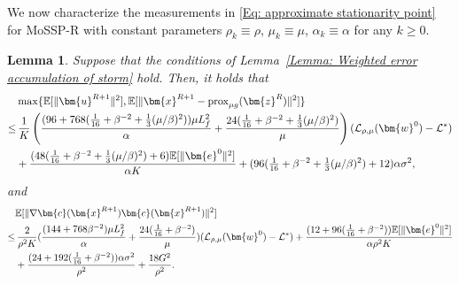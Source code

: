 \documentclass{article}
\theoremstyle{plain}
\newtheorem{lemma}{Lemma}[section]
\theoremstyle{definition}
\theoremstyle{remark}
\newcommand{\EE}{\mathbb{E}}
\newcommand{\prox}{\mathrm{prox}}
\newcommand{\bx}{\bm{x}}
\newcommand{\bc}{\bm{c}}
\newcommand{\be}{\bm{e}}
\newcommand{\bu}{\bm{u}}
\newcommand{\bz}{\bm{z}}
\newcommand{\calL}{\mathcal{L}}
\newcommand{\bw}{\bm{w}}
\numberwithin{equation}{section}
\begin{document}
We now characterize the measurements in \eqref{Eq: approximate stationarity point} for MoSSP-R with constant parameters $\rho_{k}\equiv \rho $, $\mu_{k}\equiv \mu$, $\alpha_{k}\equiv \alpha$ for any \(k \geq 0\).
\begin{lemma}
    \label{Lemma: the error bound of the infeasible stationarity in expectation for VR}
    Suppose that the conditions of Lemma~\ref{Lemma: Weighted
    error accumulation of storm} hold. Then, it holds that
   \begin{align}
\label{Eq: the criticality measure error bound in expectation for VR} & \max\{ \EE[\| \bu^{R+1}\|^{2}] , \EE [\| \bx^{R+1}- \prox_{\mu g}(\bz^{R})\|^{2}]\} \notag  \\
\leq & \, \frac{1}{K}\left( \frac{(96+768(\tfrac{1}{16}+\beta^{-2}+\tfrac{1}{3}(\mu/\beta)^2)) \mu L_f^{2}}{\alpha}+ \frac{24(\tfrac{1}{16} + \beta^{-2}+\tfrac{1}{3}(\mu/\beta)^2)}{\mu}\right) ( \calL_{\rho, \mu}(\bw^{0}) - \calL^{*}) \notag\\
& + \frac{( 48( \tfrac{1}{16} + \beta^{-2}+\tfrac{1}{3}(\mu/\beta)^2) + 6 )\EE [\| \be^{0}\|^{2}]}{\alpha K }+ ( 96 ( \tfrac{1}{16} + \beta^{-2}+\tfrac{1}{3}(\mu/\beta)^2) + 12)\alpha\sigma^{2},
    \end{align}
and
\begin{align}
\label{Eq: the infeasible stationarity error bound in expectation for VR}
&\EE [\|\nabla \bc(\bx^{R+1}) \bc(\bx^{R+1}) \|^{2}] \notag \\
\leq & \, \frac{2}{\rho^{2}K}( \frac{(144 +768 \beta^{-2}) \mu L^2_{f}}{\alpha}+ \frac{24(\tfrac{1}{16}+ \beta^{-2})}{\mu}) (\calL_{\rho, \mu}(\bw^{0}) - \calL^{*}) + \frac{( 12 + 96( \tfrac{1}{16} + \beta^{-2}))\EE [\| \be^{0}\|^{2}]}{\alpha\rho^{2}K }\notag \\
&+ \frac{( 24 + 192( \tfrac{1}{16} + \beta^{-2})) \alpha\sigma^{2}}{\rho^{2}}+\frac{18G^{2}}{\rho^{2}}.
\end{align}
\end{lemma}
\end{document}
